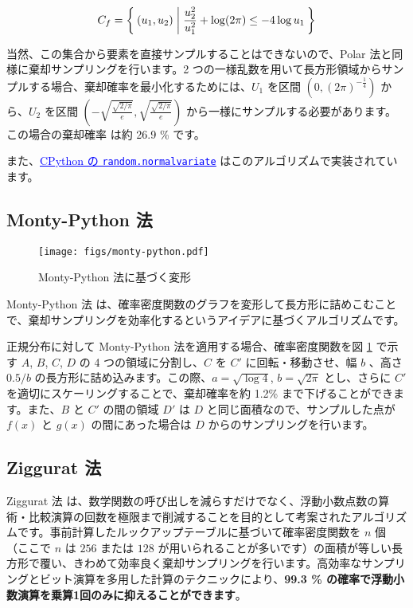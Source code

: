 \documentclass[twocolumn, dvipdfmx]{jsarticle}
\begin{document}
\begin{align*}
    C_f = \Set{ (u_1, u_2) | \frac{u_2^2}{u_1^2} + \log (2 \pi) \leq -4 \log u_1 }
\end{align*}

当然、この集合から要素を直接サンプルすることはできないので、Polar 法と同様に棄却サンプリングを行います。2 つの一様乱数を用いて長方形領域からサンプルする場合、棄却確率を最小化するためには、$U_1$ を区間 $\left(0, (2 \pi)^{-\frac{1}{4}}\right)$ から、$U_2$ を区間 $\left(-\sqrt{\frac{\sqrt{2 / \pi}}{e}}, \sqrt{\frac{\sqrt{2 / \pi}}{e}}\right)$ から一様にサンプルする必要があります。この場合の棄却確率 は約 26.9 \% です。

また、\href{https://github.com/python/cpython/blob/b0dfc7581697f20385813582de7e92ba6ba0105f/Lib/random.py#L529-L548}{\textcolor{blue}{\underline{CPython の \texttt{random.normalvariate}}}} はこのアルゴリズムで実装されています。

\subsection*{Monty-Python 法}

\begin{figure}[t]
    \centering
    \texttt{[image: figs/monty-python.pdf]}
    \caption{Monty-Python 法に基づく変形}
    \label{fig:monty-python-plot}
\end{figure}

Monty-Python 法 \cite{marsaglia1998monty} は、確率密度関数のグラフを変形して長方形に詰めこむことで、棄却サンプリングを効率化するというアイデアに基づくアルゴリズムです。

正規分布に対して Monty-Python 法を適用する場合、確率密度関数を図 \ref{fig:monty-python-plot} で示す $A$, $B$, $C$, $D$ の 4 つの領域に分割し、$C$ を $C'$ に回転・移動させ、幅 $b$ 、高さ $0.5/b$ の長方形に詰め込みます。この際、$a = \sqrt{\log 4}$, $b = \sqrt{2 \pi}$ とし、さらに $C'$ を適切にスケーリングすることで、棄却確率を約 1.2\% まで下げることができます。また、$B$ と $C'$ の間の領域 $D'$ は $D$ と同じ面積なので、サンプルした点が $f(x)$ と $g(x)$ の間にあった場合は $D$ からのサンプリングを行います。

\subsection*{Ziggurat 法}

Ziggurat 法 \cite{marsaglia1984fast, marsaglia2000ziggurat} は、数学関数の呼び出しを減らすだけでなく、浮動小数点数の算術・比較演算の回数を極限まで削減することを目的として考案されたアルゴリズムです。事前計算したルックアップテーブルに基づいて確率密度関数を $n$ 個（ここで $n$ は $256$ または $128$ が用いられることが多いです）の面積が等しい長方形で覆い、きわめて効率良く棄却サンプリングを行います。高効率なサンプリングとビット演算を多用した計算のテクニックにより、\textbf{99.3 \% の確率で浮動小数演算を乗算1回のみに抑えることができます}。
\end{document}
